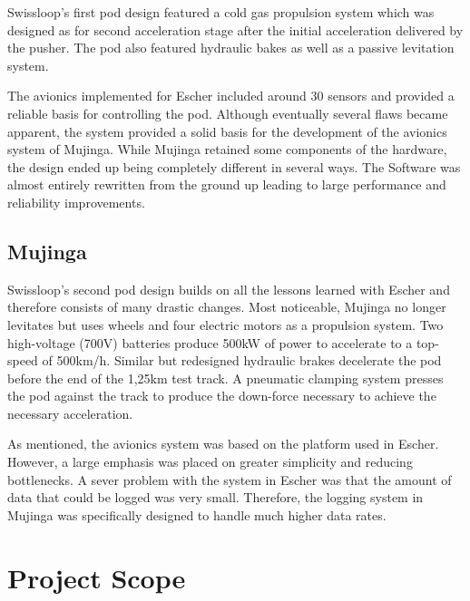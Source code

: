 Swissloop's first pod design featured a cold gas propulsion system which was designed as for second acceleration stage after the initial acceleration delivered by the pusher. The pod also featured hydraulic bakes as well as a passive levitation system.

The avionics implemented for Escher included around 30 sensors and provided a reliable basis for controlling the pod. Although eventually several flaws became apparent, the system provided a solid basis for the development of the avionics system of Mujinga. While Mujinga retained some components of the hardware, the design ended up being completely different in several ways. The Software was almost entirely rewritten from the ground up leading to large performance and reliability improvements.

\subsection{Mujinga}

Swissloop's second pod design builds on all the lessons learned with Escher and therefore consists of many drastic changes. Most noticeable, Mujinga no longer levitates but uses wheels and four electric motors as a propulsion system. Two high-voltage (700V) batteries produce 500kW of power to accelerate to a top-speed of 500km/h. Similar but redesigned hydraulic brakes decelerate the pod before the end of the 1,25km test track. A pneumatic clamping system presses the pod against the track to produce the down-force necessary to achieve the necessary acceleration.

As mentioned, the avionics system was based on the platform used in Escher. However, a large emphasis was placed on greater simplicity and reducing bottlenecks. A sever problem with the system in Escher was that the amount of data that could be logged was very small. Therefore, the logging system in Mujinga was specifically designed to handle much higher data rates.

\section{Project Scope}



